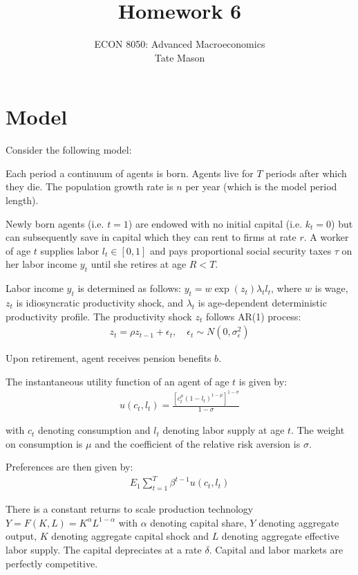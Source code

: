 \documentclass[10pt,a4paper]{article}
\begin{document}
\title{Homework 6}
\author{ECON 8050: Advanced Macroeconomics \\ Tate Mason}
\date{}
\maketitle

\section*{Model}
Consider the following model:

Each period a continuum of agents is born. Agents live for $T$ periods after which they die. The population growth rate is $n$ per year (which is the model period length).

Newly born agents (i.e. $t = 1$) are endowed with no initial capital (i.e. $k_t = 0$) but can subsequently save in capital which they can rent to firms at rate $r$. A worker of age $t$ supplies labor $l_t \in [0, 1]$ and pays proportional social security taxes $\tau$ on her labor income $y_t$ until she retires at age $R < T$.

Labor income $y_t$ is determined as follows: $y_t = w \exp(z_t)\lambda_t l_t$, where $w$ is wage, $z_t$ is idiosyncratic productivity shock, and $\lambda_t$ is age-dependent deterministic productivity profile. The productivity shock $z_t$ follows AR(1) process:
\begin{align*}
z_t = \rho z_{t-1} + \epsilon_t, \quad \epsilon_t \sim N(0, \sigma_{\epsilon}^2)
\end{align*}

Upon retirement, agent receives pension benefits $b$.

The instantaneous utility function of an agent of age $t$ is given by:
\begin{align*}
u(c_t, l_t) = \frac{[c_t^{\mu}(1-l_t)^{1-\mu}]^{1-\sigma}}{1-\sigma}
\end{align*}

with $c_t$ denoting consumption and $l_t$ denoting labor supply at age $t$. The weight on consumption is $\mu$ and the coefficient of the relative risk aversion is $\sigma$.

Preferences are then given by:
\begin{align*}
E_1 \sum_{t=1}^{T} \beta^{t-1} u(c_t, l_t)
\end{align*}

There is a constant returns to scale production technology $Y = F(K, L) = K^{\alpha}L^{1-\alpha}$ with $\alpha$ denoting capital share, $Y$ denoting aggregate output, $K$ denoting aggregate capital shock and $L$ denoting aggregate effective labor supply. The capital depreciates at a rate $\delta$. Capital and labor markets are perfectly competitive.
\end{document}
